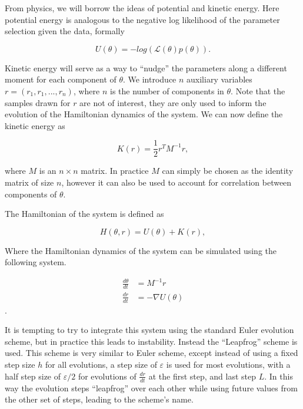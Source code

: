 \documentclass[12pt]{article}
\begin{document}
    From physics, we will borrow the ideas of potential and kinetic energy. Here potential energy is analogous to the negative log likelihood of the parameter selection given the data, formally

    \begin{equation}
        U(\theta) = -log(\mathcal{L}(\theta)p(\theta)).
    \end{equation}

    Kinetic energy will serve as a way to ``nudge'' the parameters along a different moment for each component of $\theta$. We introduce $n$ auxiliary variables $r = (r_1, r_1,...,r_n)$, where $n$ is the number of components in $\theta$. Note that the samples drawn for $r$ are not of interest, they are only used to inform the evolution of the Hamiltonian dynamics of the system. We can now define the kinetic energy as

    \begin{equation}
        K(r) = \frac{1}{2} r^T M^{-1} r,
    \end{equation}

    where $M$ is an $n \times n$ matrix. In practice $M$ can simply be chosen as the identity matrix of size $n$, however it can also be used to account for correlation between components of $\theta$.

    The Hamiltonian of the system is defined as

    \begin{equation}
        H(\theta,r) = U(\theta) + K(r),
    \end{equation}

    Where the Hamiltonian dynamics of the system can be simulated using the following system.

    \begin{equation}
        \begin{array}{rl}
            \frac{d\theta}{dt} & = M^{-1} r \\
            \frac{dr}{dt} & = - \nabla U(\theta)
        \end{array}
    \end{equation}.

    It is tempting to try to integrate this system using the standard Euler evolution scheme, but in practice this leads to instability. Instead the ``Leapfrog'' scheme is used. This scheme is very similar to Euler scheme, except instead of using a fixed step size $h$ for all evolutions, a step size of $\varepsilon$ is used for most evolutions, with a half step size of $\varepsilon / 2$ for evolutions of $\frac{dr}{dt}$ at the first step, and last step $L$. In this way the evolution steps ``leapfrog'' over each other while using future values from the other set of steps, leading to the scheme's name.
\end{document}

